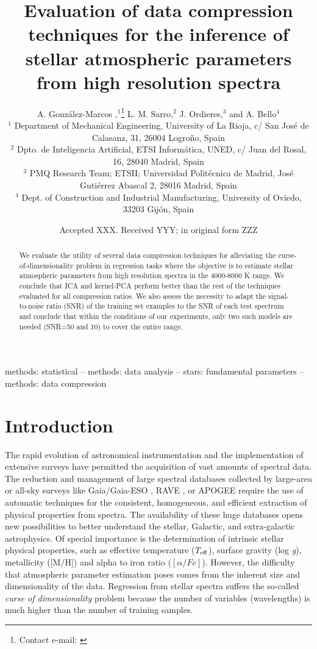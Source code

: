 \documentclass[a4paper,fleqn,usenatbib]{mnras}
\title[]{Evaluation of data compression techniques for the inference of
  stellar atmospheric parameters from high resolution spectra}
\author[K. T. Smith et al.]{
A. Gonz\'alez-Marcos ,$^{1}$\thanks{Contact e-mail: \href{mailto:}{}}
L. M. Sarro,$^{2}$
J. Ordieres,$^{3}$
and A. Bello$^{4}$
\\
$^{1}$ Department of Mechanical Engineering, University of La Rioja, c/ San Jos\'e de Calasanz, 31, 26004 Logroño, Spain  \\
$^{2}$ Dpto. de Inteligencia Artificial, ETSI Inform\'atica, UNED, c/ Juan del Rosal, 16, 28040 Madrid, Spain \\
$^{3}$ PMQ Research Team; ETSII; Universidad Polit\'ecnica de Madrid, José Guti\'errez Abascal 2, 28016 Madrid, Spain\\
$^{4}$ Dept. of Construction and Industrial Manufacturing, University of Oviedo, 33203 Gij\'on, Spain\\
}
\date{Accepted XXX. Received YYY; in original form ZZZ}
\begin{document}
\label{firstpage}
\pagerange{\pageref{firstpage}--\pageref{lastpage}}
\maketitle

\begin{abstract}
We evaluate the utility of several data compression techniques
  for alleviating the curse-of-dimensionality problem in regression
  tasks where the objective is to estimate stellar atmospheric
  parameters from high resolution spectra in the 4000-8000 K range. We
  conclude that ICA and kernel-PCA perform better than the rest of the
  techniques evaluated for all compression ratios. We also assess the
  necessity to adapt the signal-to-noise ratio (SNR) of the training
  set examples to the SNR of each test spectrum and conclude that
  within the conditions of our experiments, only two such models are
  needed (SNR=50 and 10) to cover the entire range.
\end{abstract}

\begin{keywords}
methods: statistical -- methods: data analysis -- stars: fundamental parameters -- methods: data compression
\end{keywords}



\section{Introduction}

The rapid evolution of astronomical instrumentation and the
implementation of extensive surveys have permitted the acquisition of
vast amounts of spectral data.  The reduction and management of large
spectral databases collected by large-area or all-sky surveys like
Gaia/Gaia-ESO \citep{2006MNRAS.367..290J,2012Msngr.147...25G}, RAVE
\citep{2006AJ....132.1645S}, or APOGEE \citep{2011AJ....142...72E}
require the use of automatic techniques for the consistent,
homogeneous, and efficient extraction of physical properties from
spectra. The availability of these huge databases opens new
possibilities to better understand the stellar, Galactic, and
extra-galactic astrophysics. Of special importance is the
determination of intrinsic stellar physical properties, such as
effective temperature ($T_{\rm eff}$), surface gravity (log
\textit{g}), metallicity ([M/H]) and alpha to iron ratio 
($\left[ \alpha/Fe \right]$). However, the difficulty that
atmospheric parameter estimation poses comes from the inherent size
and dimensionality of the data.  Regression from stellar spectra
suffers the so-called {\sl curse of dimensionality} problem because
the number of variables (wavelengths) is much higher than the number
of training samples. 
    
\end{document}
